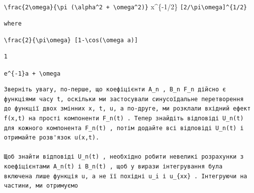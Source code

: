 \documentclass[
  ukrainian,
]{article}
\begin{document}
\texttt{\textbackslash{}frac\{2\textbackslash{}omega\}\{\textbackslash{}pi\ (\textbackslash{}alpha\^{}2\ +\ \textbackslash{}omega\^{}2)\}}
x\^{}\{-1/2\}
\texttt{{[}2/\textbackslash{}pi\textbackslash{}omega{]}\^{}\{1/2\}}

\begin{verbatim}
where
\end{verbatim}

\texttt{\textbackslash{}frac\{2\}\{\textbackslash{}pi\textbackslash{}omega\}\ {[}1-\textbackslash{}cos(\textbackslash{}omega\ a){]}}

\begin{verbatim}
1
\end{verbatim}

\texttt{e\^{}\{-1\}a\ +\ \textbackslash{}omega}

\begin{verbatim}
Зверніть увагу, по-перше, що коефіцієнти A_n , B_n F_n дійсно є функціями часу t, оскільки ми застосували синусоїдальне перетворення до функції двох змінних x, t, u, а по-друге, ми розклали вхідний ефект f(x,t) на прості компоненти F_n(t) . Тепер знайдіть відповіді U_n(t) для кожного компонента F_n(t) , потім додайте всі відповіді U_n(t) і отримайте розв'язок u(x,t).

Щоб знайти відповіді U_n(t) , необхідно робити невеликі розрахунки з коефіцієнтами A_n(t) і B_n(t) , щоб у вирази інтегрування була включена лише функція u, а не її похідні u_i і u_{xx} . Інтегруючи на частини, ми отримуємо
\end{verbatim}
\end{document}
